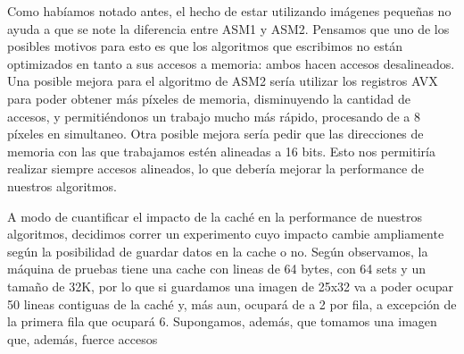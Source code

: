 Como habíamos notado antes, el hecho de estar utilizando imágenes pequeñas no ayuda a que se note la diferencia entre ASM1 y ASM2. Pensamos que uno de los posibles motivos para esto es que los algoritmos que escribimos no están optimizados en tanto a sus accesos a memoria: ambos hacen accesos desalineados. Una posible mejora para el algoritmo de ASM2 sería utilizar los registros AVX para poder obtener más píxeles de memoria, disminuyendo la cantidad de accesos, y permitiéndonos un trabajo mucho más rápido, procesando de a 8 píxeles en simultaneo. Otra posible mejora sería pedir que las direcciones de memoria con las que trabajamos estén alineadas a 16 bits. Esto nos permitiría realizar siempre accesos alineados, lo que debería mejorar la performance de nuestros algoritmos.

A modo de cuantificar el impacto de la caché en la performance de nuestros algoritmos, decidimos correr un experimento cuyo impacto cambie ampliamente según la posibilidad de guardar datos en la cache o no. Según observamos, la máquina de pruebas tiene una cache con lineas de 64 bytes, con 64 sets y un tamaño de 32K, por lo que si guardamos una imagen de 25x32 va a poder ocupar 50 lineas contiguas de la caché y, más aun, ocupará de a 2 por fila, a excepción de la primera fila que ocupará 6. Supongamos, además, que tomamos una imagen que, además, fuerce accesos 
